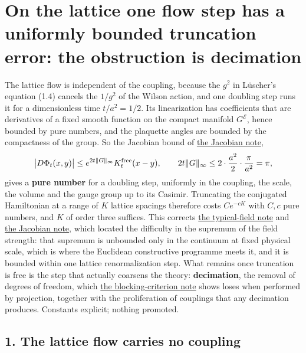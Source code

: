 \documentclass[11pt,a4paper]{article}
\begin{document}
\hypertarget{on-the-lattice-one-flow-step-has-a-uniformly-bounded-truncation-error-the-obstruction-is-decimation}{%
\section{On the lattice one flow step has a uniformly bounded truncation
error: the obstruction is
decimation}\label{on-the-lattice-one-flow-step-has-a-uniformly-bounded-truncation-error-the-obstruction-is-decimation}}

The lattice flow is independent of the coupling, because the \(g^2\) in
Lüscher's equation (1.4) cancels the \(1/g^2\) of the Wilson action, and
one doubling step runs it for a dimensionless time \(t/a^2=1/2\). Its
linearization has coefficients that are derivatives of a fixed smooth
function on the compact manifold \(G^{\mathcal E}\), hence bounded by
pure numbers, and the plaquette angles are bounded by the compactness of
the group. So the Jacobian bound of
\href{flow-jacobian-truncation-error.md}{the Jacobian note},
\[\big|D\Phi_t(x,y)\big|\le e^{2t\|G\|_\infty}K^{\rm free}_t(x-y),
\qquad 2t\|G\|_\infty\le2\cdot\frac{a^2}{2}\cdot\frac{\pi}{a^2}=\pi,\]
gives a \textbf{pure number} for a doubling step, uniformly in the
coupling, the scale, the volume and the gauge group up to its Casimir.
Truncating the conjugated Hamiltonian at a range of \(K\) lattice
spacings therefore costs \(Ce^{-cK}\) with \(C,c\) pure numbers, and
\(K\) of order three suffices. This corrects
\href{typical-field-strength-window.md}{the typical-field note} and
\href{flow-jacobian-truncation-error.md}{the Jacobian note}, which
located the difficulty in the supremum of the field strength: that
supremum is unbounded only in the continuum at fixed physical scale,
which is where the Euclidean constructive programme meets it, and it is
bounded within one lattice renormalization step. What remains once
truncation is free is the step that actually coarsens the theory:
\textbf{decimation}, the removal of degrees of freedom, which
\href{blocking-criterion-monotone.md}{the blocking-criterion note} shows
loses when performed by projection, together with the proliferation of
couplings that any decimation produces. Constants explicit; nothing
promoted.

\hypertarget{the-lattice-flow-carries-no-coupling}{%
\subsection{1. The lattice flow carries no
coupling}\label{the-lattice-flow-carries-no-coupling}}
\end{document}
